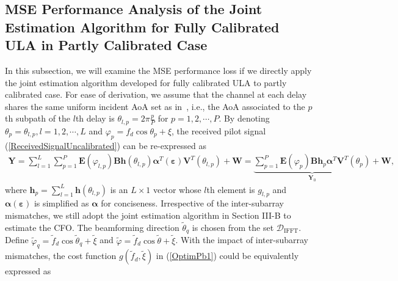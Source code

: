 \documentclass[12pt, draftclsnofoot, onecolumn]{IEEEtran}
\begin{document}
\subsection{MSE Performance Analysis of the Joint Estimation Algorithm for Fully Calibrated ULA in Partly Calibrated Case}
In this subsection, we will examine the MSE performance loss if we directly apply the joint estimation algorithm developed for fully calibrated ULA to partly calibrated case.
For ease of derivation, we assume that the channel at each delay shares the same uniform incident AoA set as in~\cite{YR_Zheng2003TC}, i.e., the AoA associated to the $p$th subpath of the $l$th delay is $\theta_{l,p} = 2\pi \frac{p}{P}$ for $p=1,2,\cdots\!,P$.
By denoting ${\theta_{p}} = {\theta_{l,p}}, l=1,2,\cdots\!,L$ and ${{\varphi }_{p}}={{f}_{d}}\cos {{\theta }_{p}}+\xi $, the received pilot signal (\ref{ReceivedSignalUncalibrated}) can be re-expressed as
\begin{align}
{{\mathbf{Y}}} = \sum\limits_{l=1}^{L}{\sum\limits_{{p}=1}^{P}{\mathbf{E}\left( {{\varphi }_{l,{p}}} \right){{\mathbf{B}}}\mathbf{h}\left( {{\theta }_{l,{p}}} \right) {\boldsymbol{\alpha}}^{T}\left( \boldsymbol{\varepsilon} \right) {\mathbf{V}}^{T}\left( \theta_{l,p} \right) }} + {{\mathbf{W}}} = \underbrace{\sum\limits_{p=1}^{P}{\mathbf{E}\left( {{\varphi }_{p}} \right)\mathbf{B}{{\mathbf{h}}_{p}}{{\boldsymbol{\alpha }}^{T}}{{\mathbf{V}}^{T}}\left( {{\theta }_{p}} \right)}}_{{{\mathbf{Y}}_{0}}}+\mathbf{W},
\end{align}
where ${{\mathbf{h}}_{p}} = \sum\nolimits_{l=1}^{L}{\mathbf{h}\left( {{\theta }_{l,{p}}} \right)}$ is an $L\times 1$ vector whose $l$th element is $g_{l,p}$ and ${\boldsymbol{\alpha }} \left( \boldsymbol{\varepsilon} \right)$ is simplified as ${\boldsymbol{\alpha }}$ for conciseness. Irrespective of the inter-subarray mismatches, we still adopt the joint estimation algorithm in Section III-B to estimate the CFO. The beamforming direction ${\tilde{\theta}}_{q}$ is chosen from the set ${{\mathcal{D}}_{\text{IFFT}}}$. Define ${\tilde{\varphi}}_{q}={{\tilde{f}}_{d}}\cos {\tilde{\theta}}_{q}+\tilde{\xi }$ and $\tilde{\varphi }={{\tilde{f}}_{d}}\cos \tilde{\theta }+\tilde{\xi }$. With the impact of inter-subarray mismatches, the cost function $g\left( {{{\tilde{f}}}_{d}}, \tilde{\xi } \right)$ in (\ref{OptimPb1}) could be equivalently expressed as
\end{document}
